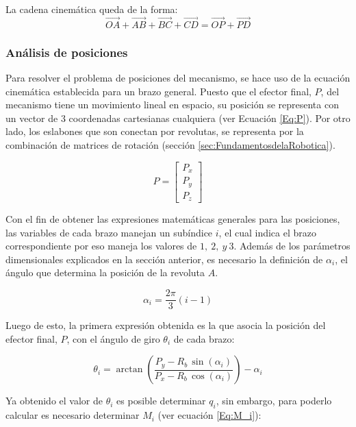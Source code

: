 La cadena cinemática queda de la forma:
\begin{equation}
    \vec{OA} + \vec{AB} + \vec{BC} + \vec{CD} = \vec{OP} + \vec{PD}
    \label{Eq:cadenacinematica}
\end{equation}

\subsubsection{Análisis de posiciones}
Para resolver el problema de posiciones del mecanismo, se hace uso de la ecuación cinemática establecida para un brazo general. Puesto que el efector final, $P$, del mecanismo tiene un movimiento lineal en espacio, su posición se representa con un vector de 3 coordenadas cartesianas cualquiera (ver Ecuación \ref{Eq:P}). Por otro lado,  los eslabones que son conectan por revolutas, se representa por la combinación de matrices de rotación (sección \ref{sec:FundamentosdelaRobotica}). 

\begin{equation}
    P = \left[\begin{array}{c} P_x \\ P_y \\ P_z \end{array} \right]
    \label{Eq:P}
\end{equation}

Con el fin de obtener las expresiones matemáticas generales para las posiciones, las variables de cada brazo manejan un subíndice $i$, el cual indica el brazo correspondiente por eso maneja los valores de $1, ~2, ~y~3$. Además de los parámetros dimensionales explicados en la sección anterior, es necesario la definición de $\alpha_i$, el ángulo que determina la posición de la revoluta $A$.

\begin{equation}
    \alpha_i = \frac{2\pi}{3}\left( i - 1 \right)
\end{equation}

Luego de esto, la primera expresión obtenida es la que asocia la posición del efector final, $P$, con el ángulo de giro $\theta_i$ de cada brazo:

\begin{equation}
    \theta _{i}=\arctan\left(\frac{P_{y}-R_{b}\,\sin\left(\alpha _{i}\right)}{P_{x}-R_{b}\,\cos\left(\alpha _{i}\right)}\right)-\alpha _{i}
\end{equation}

Ya obtenido el valor de $\theta_i$ es posible determinar $q_i$, sin embargo, para poderlo calcular es necesario determinar $M_i$ (ver ecuación \ref{Eq:M_i}):

